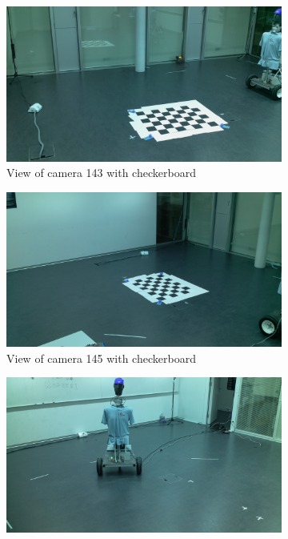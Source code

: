 \begin{figure}[H]
    \centering
    \begin{subfigure}{0.49\linewidth}
        \includegraphics[width=\linewidth]{files/res2_image_143.png}
        \caption{View of camera 143 with checkerboard}
        \label{fig:res2_image_143}
    \end{subfigure}
    \begin{subfigure}{0.49\linewidth}
        \includegraphics[width=\linewidth]{files/res2_image_145.png}
        \caption{View of camera 145 with checkerboard}
        \label{fig:res2_image_145}
    \end{subfigure}
    \begin{subfigure}{0.49\linewidth}
        \includegraphics[width=\linewidth]{files/res2_0_image_141.png}

\end{subfigure}
\end{figure}
